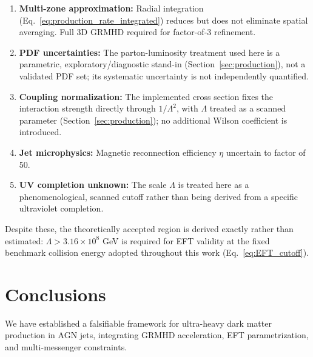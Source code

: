 \documentclass[twocolumn,superscriptaddress,prd,nofootinbib]{revtex4-2}
\begin{document}
\begin{enumerate}
\item \textbf{Multi-zone approximation:} Radial integration (Eq.~\ref{eq:production_rate_integrated}) reduces but does not eliminate spatial averaging. Full 3D GRMHD required for factor-of-3 refinement.

\item \textbf{PDF uncertainties:} The parton-luminosity treatment used here is a parametric, exploratory/diagnostic stand-in (Section~\ref{sec:production}), not a validated PDF set; its systematic uncertainty is not independently quantified.

\item \textbf{Coupling normalization:} The implemented cross section fixes the interaction strength directly through $1/\Lambda^2$, with $\Lambda$ treated as a scanned parameter (Section~\ref{sec:production}); no additional Wilson coefficient is introduced.

\item \textbf{Jet microphysics:} Magnetic reconnection efficiency $\eta$ uncertain to factor of 50.

\item \textbf{UV completion unknown:} The scale $\Lambda$ is treated here as a phenomenological, scanned cutoff rather than being derived from a specific ultraviolet completion.
\end{enumerate}

Despite these, the theoretically accepted region is derived exactly rather than estimated: $\Lambda > 3.16\times10^8$ GeV is required for EFT validity at the fixed benchmark collision energy adopted throughout this work (Eq.~\ref{eq:EFT_cutoff}).

\section{Conclusions}
\label{sec:conclusions}

We have established a falsifiable framework for ultra-heavy dark matter production in AGN jets, integrating GRMHD acceleration, EFT parametrization, and multi-messenger constraints.
\end{document}
